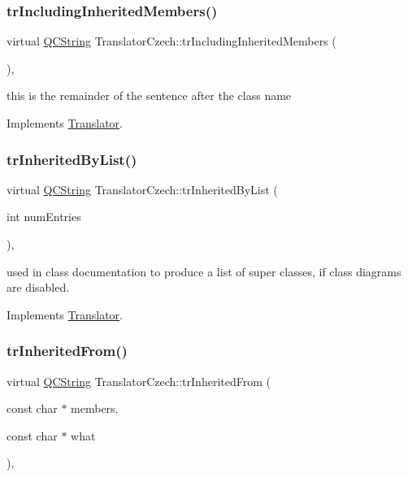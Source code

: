 \subsubsection{\texorpdfstring{trIncludingInheritedMembers()}{trIncludingInheritedMembers()}}
{\footnotesize\ttfamily virtual \mbox{\hyperlink{class_q_c_string}{Q\+C\+String}} Translator\+Czech\+::tr\+Including\+Inherited\+Members (\begin{DoxyParamCaption}{ }\end{DoxyParamCaption})\hspace{0.3cm}{\ttfamily [inline]}, {\ttfamily [virtual]}}

this is the remainder of the sentence after the class name 

Implements \mbox{\hyperlink{class_translator}{Translator}}.

\mbox{\label{class_translator_czech_a05ea646c77aa8db1faac4dfeaf9fd7cd}} 
\subsubsection{\texorpdfstring{trInheritedByList()}{trInheritedByList()}}
{\footnotesize\ttfamily virtual \mbox{\hyperlink{class_q_c_string}{Q\+C\+String}} Translator\+Czech\+::tr\+Inherited\+By\+List (\begin{DoxyParamCaption}\item[{int}]{num\+Entries }\end{DoxyParamCaption})\hspace{0.3cm}{\ttfamily [inline]}, {\ttfamily [virtual]}}

used in class documentation to produce a list of super classes, if class diagrams are disabled. 

Implements \mbox{\hyperlink{class_translator}{Translator}}.

\mbox{\label{class_translator_czech_abf4f9fcda10ccf0df5bce70c78900843}} 
\subsubsection{\texorpdfstring{trInheritedFrom()}{trInheritedFrom()}}
{\footnotesize\ttfamily virtual \mbox{\hyperlink{class_q_c_string}{Q\+C\+String}} Translator\+Czech\+::tr\+Inherited\+From (\begin{DoxyParamCaption}\item[{const char $\ast$}]{members,  }\item[{const char $\ast$}]{what }\end{DoxyParamCaption})\hspace{0.3cm}{\ttfamily [inline]}, {\ttfamily [virtual]}}

